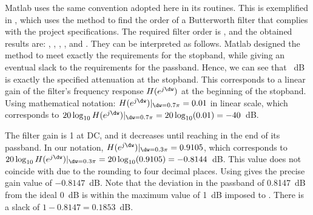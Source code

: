 Matlab uses the same convention adopted here in its routines. This is exemplified in , which uses
the method  to find the order of a Butterworth filter that complies with the project specifications.
The required filter order is , and the obtained results are:
, , 
, ,  and .
They can be interpreted as follows. Matlab designed the method  to meet
exactly the requirements for the stopband, while giving an eventual slack to the requirements
for the passband. Hence, we can see that ~dB is exactly the specified attenuation
at the stopband. This corresponds to a linear gain  of the filter's frequency
response $H(e^{j \dw})$ at the beginning of the stopband. Using mathematical notation: $H(e^{j \dw})|_{\dw=0.7 \pi} = 0.01$ 
in linear scale, 
which corresponds to $20 \log_{10} H(e^{j \dw})|_{\dw=0.7 \pi} = 20 \log_{10} (0.01) = -40$~dB.

The filter gain is 1 at DC, and it decreases until reaching  in the end of its passband.
 In our notation, $H(e^{j \dw})|_{\dw=0.3 \pi} = 0.9105$, 
which corresponds to $20 \log_{10} H(e^{j \dw})|_{\dw=0.3 \pi} = 20 \log_{10} (0.9105) = -0.8144$~dB.
This value does not coincide with  due to the rounding to four decimal places.
Using  gives the precise gain value of $-0.8147$~dB. Note that the deviation in the passband
of 0.8147~dB from the ideal 0~dB is within the maximum value of 1~dB imposed to . There
is a slack of $1-0.8147=0.1853$~dB.

